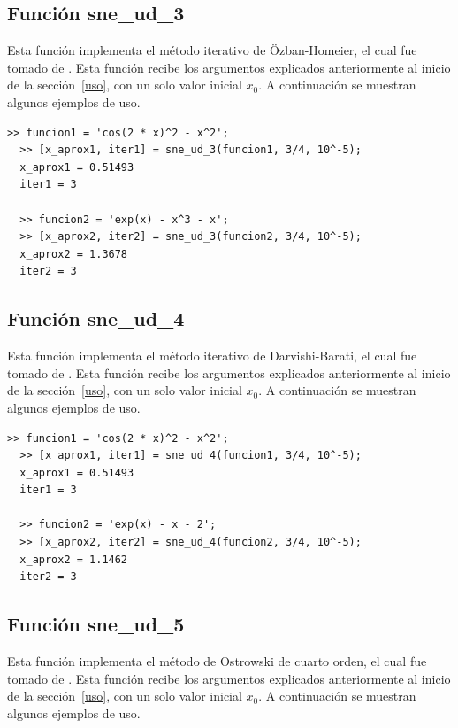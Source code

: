 \documentclass[12pt]{article}
\begin{document}
\subsection{Función sne\_ud\_3}
Esta función implementa el método iterativo de Özban-Homeier, el cual fue tomado de \cite{kiran2015performance}. Esta función recibe los argumentos explicados anteriormente al inicio de la sección~\ref{uso}, con un solo valor inicial $x_{0}$. A continuación se muestran algunos ejemplos de uso.

\begin{minipage}{\linewidth}
\begin{lstlisting}[frame = single]
  >> funcion1 = 'cos(2 * x)^2 - x^2';
  >> [x_aprox1, iter1] = sne_ud_3(funcion1, 3/4, 10^-5);
  x_aprox1 = 0.51493
  iter1 = 3

  >> funcion2 = 'exp(x) - x^3 - x';
  >> [x_aprox2, iter2] = sne_ud_3(funcion2, 3/4, 10^-5);
  x_aprox2 = 1.3678
  iter2 = 3

\end{lstlisting}
\end{minipage}

\subsection{Función sne\_ud\_4}
Esta función implementa el método iterativo de Darvishi-Barati, el cual fue tomado de \cite{kiran2015performance}. Esta función recibe los argumentos explicados anteriormente al inicio de la sección~\ref{uso}, con un solo valor inicial $x_{0}$. A continuación se muestran algunos ejemplos de uso.

\begin{minipage}{\linewidth}
\begin{lstlisting}[frame = single]
  >> funcion1 = 'cos(2 * x)^2 - x^2';
  >> [x_aprox1, iter1] = sne_ud_4(funcion1, 3/4, 10^-5);
  x_aprox1 = 0.51493
  iter1 = 3

  >> funcion2 = 'exp(x) - x - 2';
  >> [x_aprox2, iter2] = sne_ud_4(funcion2, 3/4, 10^-5);
  x_aprox2 = 1.1462
  iter2 = 3

\end{lstlisting}
\end{minipage}

\subsection{Función sne\_ud\_5}
Esta función implementa el método de Ostrowski de cuarto orden, el cual fue tomado de \cite{behl2015construction}. Esta función recibe los argumentos explicados anteriormente al inicio de la sección~\ref{uso}, con un solo valor inicial $x_{0}$. A continuación se muestran algunos ejemplos de uso.
\end{document}
